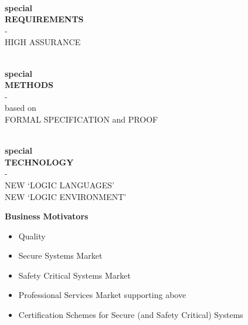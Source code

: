 \begin{slide}{}

\begin{center}

\ \\

{\bf special\\
REQUIREMENTS}\\
-\\
HIGH ASSURANCE

\ \\

{\bf special\\
METHODS}\\
-\\
based on\\
FORMAL SPECIFICATION and PROOF

\ \\

{\bf special\\
TECHNOLOGY}\\
-\\
NEW `LOGIC LANGUAGES'\\
NEW `LOGIC ENVIRONMENT'

\end{center}
\end{slide}


\begin{slide}{}
\begin{center}
{\bf Business Motivators}
\end{center}

\begin{itemize}
\item
Quality

\item
Secure Systems Market

\item
Safety Critical Systems Market

\item
Professional Services Market supporting above

\item
Certification Schemes for Secure (and Safety Critical) Systems
\end{itemize}

\end{slide}

